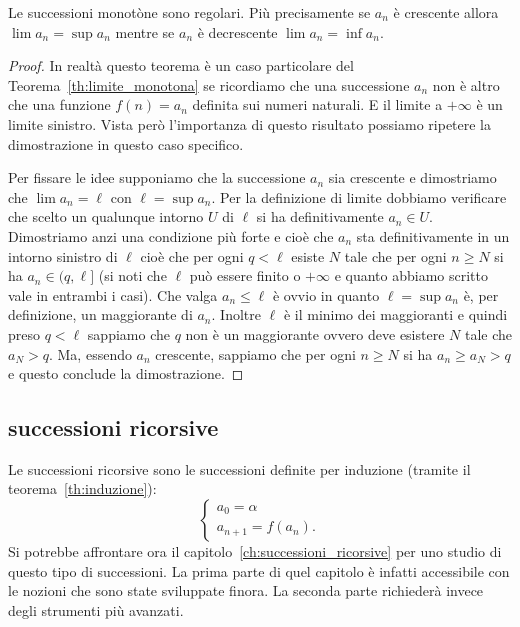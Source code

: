 \begin{theorem}
\label{th:limite_monotona}%
Le successioni monotòne sono regolari.
Più precisamente se $a_n$ è crescente allora $\lim a_n = \sup a_n$ 
mentre se $a_n$ è decrescente $\lim a_n = \inf a_n$.
\end{theorem}
\begin{proof}
In realtà questo teorema è un caso particolare del 
Teorema~\ref{th:limite_monotona} se ricordiamo che una successione 
$a_n$ non è altro che una funzione $f(n)=a_n$ definita sui numeri naturali.
E il limite a $+\infty$ è un limite sinistro.
Vista però l'importanza di questo risultato possiamo ripetere la dimostrazione 
in questo caso specifico.

Per fissare le idee supponiamo che la successione $a_n$ sia crescente e dimostriamo 
che $\lim a_n = \ell$ con $\ell=\sup a_n$.
Per la definizione di limite dobbiamo verificare che scelto un qualunque intorno $U$ 
di $\ell$ si ha definitivamente $a_n\in U$.
Dimostriamo anzi una condizione più forte e cioè che $a_n$ sta definitivamente 
in un intorno sinistro di $\ell$ cioè che per ogni $q<\ell$ esiste $N$ tale che 
per ogni $n\ge N$ si ha $a_n\in (q,\ell]$ (si noti che $\ell$ può essere finito o $+\infty$ 
e quanto abbiamo scritto vale in entrambi i casi).
Che valga $a_n\le \ell$ è ovvio in quanto $\ell=\sup a_n$ è, per definizione, un maggiorante 
di $a_n$. Inoltre $\ell$ è il minimo dei maggioranti e quindi preso 
$q<\ell$ sappiamo che $q$ non è un maggiorante ovvero deve esistere $N$ tale che 
$a_N > q$. Ma, essendo $a_n$ crescente, sappiamo che per ogni $n\ge N$ si ha 
$a_n \ge a_N >q$ e questo conclude la dimostrazione.
\end{proof}


\subsection{successioni ricorsive}

Le successioni ricorsive sono le successioni
definite per induzione (tramite il teorema~\ref{th:induzione}):
\[
 \begin{cases}
   a_0 = \alpha \\
   a_{n+1} = f(a_n).
 \end{cases}
\]
Si potrebbe affrontare ora il capitolo~\ref{ch:successioni_ricorsive}
per uno studio di questo tipo di successioni.
La prima parte di quel capitolo è infatti accessibile con le nozioni
che sono state sviluppate finora.
La seconda parte richiederà invece degli strumenti più avanzati.

